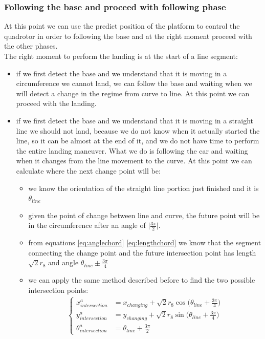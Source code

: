 \subsubsection{Following the base and proceed with following phase}
At this point we can use the predict position of the platform to control the quadrotor in order to following the base and at the right moment proceed with the other phases.\\
The right moment to perform the landing is at the start of a line segment:
\begin{itemize}
\item if we first detect the base and we understand that it is moving in a circumference we cannot land, we can follow the base and waiting when we will detect a change in the regime from curve to line. At this point we can proceed with the landing.
\item if we first detect the base and we understand that it is moving in a straight line we should not land, because we do not know when it actually started the line, so it can be almost at the end of it, and we do not have time to perform the entire landing maneuver. What we do is following the car and waiting when it changes from the line movement to the curve. At this point we can calculate where the next change point will be:
\begin{itemize}
\item we know the orientation of the straight line portion just finished and it is $\theta_{line}$
\item given the point of change between line and curve, the future point will be in the circumference after an angle of $\big | \frac{3\pi}{2} \big |$.
\item from equations \ref{eq:anglechord} \ref{eq:lengthchord} we know that the segment connecting the change point and the future intersection point has length $\sqrt{2}r_8$ and angle $\theta_{line} \pm \frac{3\pi}{4} $
\item we can apply the same method described before to find the two possible intersection points:
\begin{align}
\begin{cases}
x_{intersection}^a &= x_{changing} + \sqrt{2}r_8\cos{\Big(\theta_{line} + \frac{3\pi}{4}\Big) }\\
y_{intersection}^a &= y_{changing} + \sqrt{2}r_8\sin{\Big(\theta_{line} + \frac{3\pi}{4}\Big) }\\
\theta_{intersection}^a &=  \theta_{line} + \frac{3\pi}{2}
\label{eq:finalstatecurveb}
\end{cases}
\end{align}


\end{itemize}
\end{itemize}
